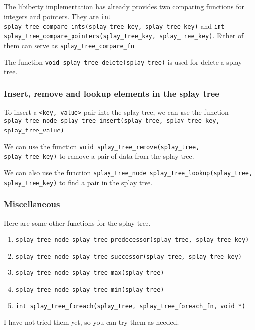 \documentclass[11pt]{article}
\begin{document}
The libiberty implementation has already provides two comparing functions for integers and pointers. They are \texttt{int splay\_tree\_compare\_ints(splay\_tree\_key, splay\_tree\_key)}
and \texttt{int splay\_tree\_compare\_pointers(splay\_tree\_key, splay\_tree\_key)}. Either of them can serve as \texttt{splay\_tree\_compare\_fn}

The function \texttt{void splay\_tree\_delete(splay\_tree)} is used for delete a splay tree.
\subsubsection{Insert, remove and lookup elements in the splay tree}

To insert a \texttt{<key, value>} pair into the splay tree, we can use the function \texttt{splay\_tree\_node splay\_tree\_insert(splay\_tree, splay\_tree\_key, splay\_tree\_value)}.

We can use the function \texttt{void splay\_tree\_remove(splay\_tree, splay\_tree\_key)} to remove a pair of data from the splay tree.

We can also use the function \texttt{splay\_tree\_node splay\_tree\_lookup(splay\_tree, splay\_tree\_key)} to find a pair in the splay tree.

\subsubsection{Miscellaneous}
Here are some other functions for the splay tree.
\begin{enumerate}
\item \texttt{splay\_tree\_node splay\_tree\_predecessor(splay\_tree, splay\_tree\_key)}
\item \texttt{splay\_tree\_node splay\_tree\_successor(splay\_tree, splay\_tree\_key)}
\item \texttt{splay\_tree\_node splay\_tree\_max(splay\_tree)}
\item \texttt{splay\_tree\_node splay\_tree\_min(splay\_tree)}
\item \texttt{int splay\_tree\_foreach(splay\_tree, splay\_tree\_foreach\_fn, void *)}
\end{enumerate}

I have not tried them yet, so you can try them as needed.
\pagebreak
\end{document}
